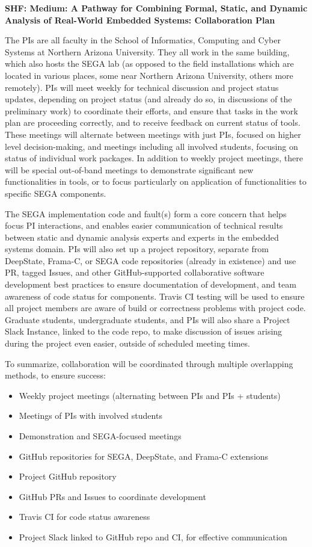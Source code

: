 \documentclass{article}
\begin{document}
\begin{center}
{\Large\sf\textbf{SHF: Medium: A Pathway for Combining Formal, Static, and Dynamic Analysis of Real-World Embedded Systems: Collaboration Plan}}
\end{center}

The PIs are all faculty in the School of Informatics, Computing and Cyber Systems at Northern Arizona University.  They all work in the same building, which also hosts the SEGA lab (as opposed to the field installations which are located in various places, some near Northern Arizona University, others more remotely).  PIs will meet weekly for technical discussion and project status updates, depending on project status (and already do so, in discussions of the preliminary work) to coordinate their efforts, and ensure that tasks in the work plan are proceeding correctly, and to receive feedback on current status of tools.  These meetings will alternate between meetings with just PIs, focused on higher level decision-making, and meetings including all involved students, focusing on status of individual work packages.
In addition to weekly project meetings, there will be special out-of-band meetings to demonstrate significant new functionalities in tools, or to focus particularly on application of functionalities to specific SEGA components.

The SEGA implementation code and fault(s) form a core concern that helps focus PI interactions, and enables easier communication of technical results between static and dynamic analysis experts and experts in the embedded systems domain.  PIs will also set up a project repository, separate from DeepState, Frama-C, or SEGA code repositories (already in existence) and use PR, tagged Issues, and other GitHub-supported collaborative software development best practices to ensure documentation of development, and team awareness of code status for components.  Travis CI testing will be used to ensure all project members are aware of build or correctness problems with project code.  Graduate students, undergraduate students, and PIs will also share a Project Slack Instance, linked to the code repo, to make discussion of issues arising during the project even easier, outside of scheduled meeting times.

To summarize, collaboration will be coordinated through multiple overlapping methods, to ensure success:
\begin{itemize}
\item Weekly project meetings (alternating between PIs and PIs + students)
\item Meetings of PIs with involved students
\item Demonstration and SEGA-focused meetings
\item GitHub repositories for SEGA, DeepState, and Frama-C extensions
\item Project GitHub repository
\item GitHub PRs and Issues to coordinate development
\item Travis CI for code status awareness
\item Project Slack linked to GitHub repo and CI, for effective communication
\end{itemize}
\end{document}
